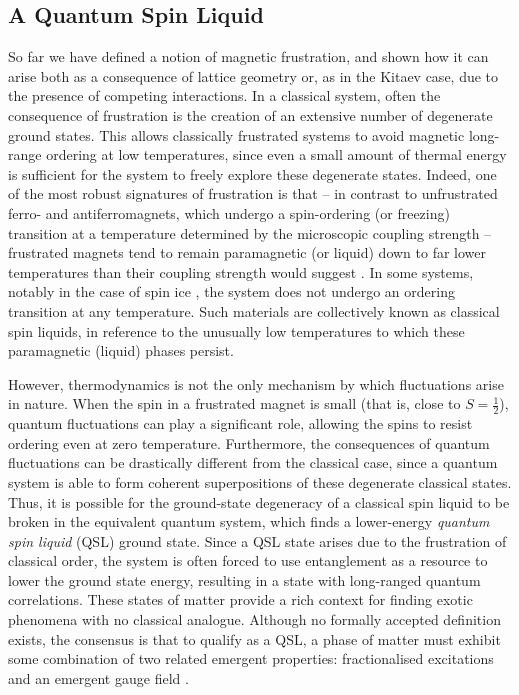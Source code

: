 \subsection{A Quantum Spin Liquid}

So far we have defined a notion of magnetic frustration, and shown how it can arise both as a consequence of lattice geometry or, as in the Kitaev case, due to the presence of competing interactions. In a classical system, often the consequence of frustration is the creation of an extensive number of degenerate ground states. This allows classically frustrated systems to avoid magnetic long-range ordering at low temperatures, since even a small amount of thermal energy is sufficient for the system to freely explore these degenerate states. Indeed, one of the most robust signatures of frustration is that -- in contrast to unfrustrated ferro- and antiferromagnets, which undergo a spin-ordering (or freezing) transition at a temperature determined by the microscopic coupling strength \cite{simon_oxford_2013} --  frustrated magnets tend to remain paramagnetic (or liquid) down to far lower temperatures than their coupling strength would suggest \cite{chalker_geometrically_2011,mugiraneza_tutorial_2022}. In some systems, notably in the case of spin ice \cite{castelnovo_magnetic_2008,castelnovo_spin_2012,udagawa_spin_2021}, the system does not undergo an ordering transition at any temperature. Such materials are collectively known as classical spin liquids, in reference to the unusually low temperatures to which these paramagnetic (liquid) phases persist. 

However, thermodynamics is not the only mechanism by which fluctuations arise in nature. When the spin in a frustrated magnet is small (that is, close to $S = \frac 12$), quantum fluctuations can play a significant role, allowing the spins to resist ordering even at zero temperature. Furthermore, the consequences of quantum fluctuations can be drastically different from the classical case, since a quantum system is able to form coherent superpositions of these degenerate classical states. Thus, it is possible for the ground-state degeneracy of a classical spin liquid to be broken in the equivalent quantum system, which finds a lower-energy \textit{quantum spin liquid} (QSL) ground state. Since a QSL state arises due to the frustration of classical order, the system is often forced to use entanglement as a resource to lower the ground state energy, resulting in a state with long-ranged quantum correlations. These states of matter provide a rich context for finding exotic phenomena with no classical analogue. Although no formally accepted definition exists, the consensus is that to qualify as a QSL, a phase of matter must exhibit some combination of two related emergent properties: fractionalised excitations and an emergent gauge field \cite{knolle_field_2019,savary_quantum_2017}.

